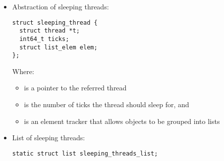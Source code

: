 \begin{itemize}

\item Abstraction of sleeping threads:\\

\begin{lstlisting}
struct sleeping_thread {
  struct thread *t;
  int64_t ticks;
  struct list_elem elem;
};
\end{lstlisting}

Where:\begin{itemize}
	\item {} is a pointer to the referred thread
	\item {} is the number of ticks the thread should sleep for, and
	\item {} is an element tracker that allows  objects to be grouped into lists
\end{itemize} 

\item List of sleeping threads:\\
\begin{lstlisting}
static struct list sleeping_threads_list;   
\end{lstlisting}

\end{itemize}
